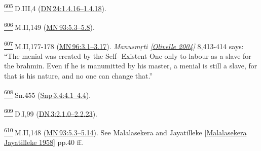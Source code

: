 \label{footprints_split_025.html_fn605}
\hyperref[footprints_split_015.htmlux5cux23fnref605]{\textsuperscript{605}} D.III,4
(\href{https://suttacentral.net/dn24/en/sujato\#1.4.16}{DN\,24:1.4.16--1.4.18}).

\label{footprints_split_025.html_fn606}
\hyperref[footprints_split_015.htmlux5cux23fnref606]{\textsuperscript{606}} M.II,149
(\href{https://suttacentral.net/mn93/en/sujato\#5.3}{MN\,93:5.3--5.8}).

\label{footprints_split_025.html_fn607}
\hyperref[footprints_split_015.htmlux5cux23fnref607]{\textsuperscript{607}} M.II,177-178
(\href{https://suttacentral.net/mn96/en/sujato\#3.1}{MN\,96:3.1--3.17}).
\emph{{Manusmṛti
{{[}\hyperref[footprints_split_022.htmlux5cux23Olivelleux5cux25202004]{Olivelle
2004}{]}}}} 8,413-414 says: ``The menial was created by the Self-
Existent One only to labour as a slave for the brahmin. Even if he is
manumitted by his master, a menial is still a slave, for that is his
nature, and no one can change that.''

\label{footprints_split_025.html_fn608}
\hyperref[footprints_split_015.htmlux5cux23fnref608]{\textsuperscript{608}} Sn.455
(\href{https://suttacentral.net/snp3.4/en/sujato\#4.1}{Snp\,3.4:4.1--4.4}).

\label{footprints_split_025.html_fn609}
\hyperref[footprints_split_015.htmlux5cux23fnref609]{\textsuperscript{609}} D.I,99
(\href{https://suttacentral.net/dn3/en/sujato\#2.1.0}{DN\,3:2.1.0--2.2.23}).

\label{footprints_split_025.html_fn610}
\hyperref[footprints_split_015.htmlux5cux23fnref610]{\textsuperscript{610}} M.II,148
(\href{https://suttacentral.net/mn93/en/sujato\#5.3}{MN\,93:5.3--5.14}).
See {Malalasekera and Jayatilleke
{{[}\hyperref[footprints_split_022.htmlux5cux23Malalasekeraux5cux2520Jayatillekeux5cux25201958]{Malalasekera
Jayatilleke 1958}{]}}} pp.40 ff.

